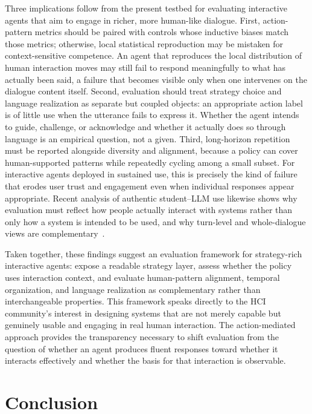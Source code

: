 \documentclass[manuscript,review,anonymous]{acmart}
\begin{document}
Three implications follow from the present testbed for evaluating interactive
agents that aim to engage in richer, more human-like dialogue. First,
action-pattern metrics should be paired with controls whose inductive biases
match those metrics; otherwise, local statistical reproduction may be mistaken
for context-sensitive competence. An agent that reproduces the local
distribution of human interaction moves may still fail to respond meaningfully
to what has actually been said, a failure that becomes visible only when one
intervenes on the dialogue content itself. Second, evaluation should treat
strategy choice and language realization as separate but coupled objects: an
appropriate action label is of little use when the utterance fails to express
it. Whether the agent intends to guide, challenge, or acknowledge and whether
it actually does so through language is an empirical question, not a given.
Third, long-horizon repetition must be reported alongside diversity and
alignment, because a policy can cover human-supported patterns while repeatedly
cycling among a small subset. For interactive agents deployed in sustained use,
this is precisely the kind of failure that erodes user trust and engagement even
when individual responses appear appropriate.
Recent analysis of authentic student--LLM use likewise shows why evaluation
must reflect how people actually interact with systems rather than only how a
system is intended to be used, and why turn-level and whole-dialogue views are
complementary~\citep{kobler2026students}.

Taken together, these findings suggest an evaluation framework for
strategy-rich interactive agents: expose a readable strategy layer, assess
whether the policy uses interaction context, and evaluate human-pattern
alignment, temporal organization, and language realization as complementary
rather than interchangeable properties. This framework speaks directly to the
HCI community's interest in designing systems that are not merely capable but
genuinely usable and engaging in real human interaction. The action-mediated
approach provides the transparency necessary to shift evaluation from the
question of whether an agent produces fluent responses toward whether it
interacts effectively and whether the basis for that interaction is observable.

\section{Conclusion}
\end{document}
